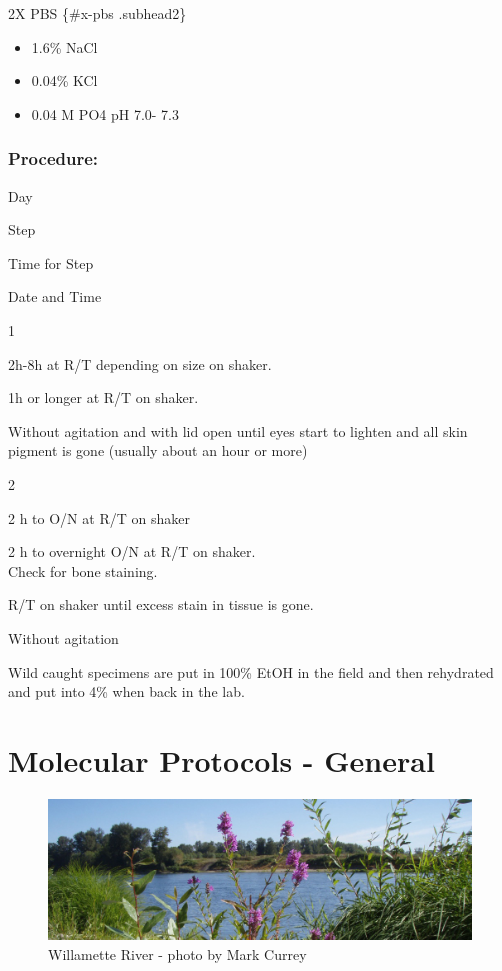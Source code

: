 \documentclass[
]{book}
\providecommand{\tightlist}{%
  \setlength{\itemsep}{0pt}\setlength{\parskip}{0pt}}
\begin{document}
2X PBS \{\#x-pbs .subhead2\}

\begin{itemize}
\tightlist
\item
  1.6\% NaCl
\item
  0.04\% KCl
\item
  0.04 M PO4 pH 7.0- 7.3
\end{itemize}

\hypertarget{procedure-19}{%
\subsection{Procedure:}\label{procedure-19}}

Day

Step

Time for Step

Date and Time

1

2h-8h at R/T depending on size on shaker.

1h or longer at R/T on shaker.

Without agitation and with lid open until eyes start to lighten and all
skin pigment is gone (usually about an hour or more)

2

2 h to O/N at R/T on shaker

2 h to overnight O/N at R/T on shaker.\\
Check for bone staining.

R/T on shaker until excess stain in tissue is gone.

Without agitation

Wild caught specimens are put in 100\% EtOH in the field and then
rehydrated and put into 4\% when back in the lab.

\hypertarget{molecular-protocols---general}{%
\chapter{Molecular Protocols - General}\label{molecular-protocols---general}}

\begin{figure}
\centering
\includegraphics{images/willamette_header.jpg}
\caption{Willamette River - photo by Mark Currey}
\end{figure}
\end{document}
